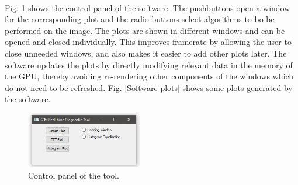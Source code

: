 \documentclass[12pt, twocolumn]{report}
\begin{document}
\paragraph{}
Fig. \ref{Software control panel} shows the control panel of the software. The pushbuttons open a window for the corresponding plot and the radio buttons select algorithms to bo be performed on the image. The plots are shown in different windows and can be opened and closed individually. This improves framerate by allowing the user to close unneeded windows, and also makes it easier to add other plots later. The software updates the plots by directly modifying relevant data in the memory of the GPU, thereby avoiding re-rendering other components of the windows which do not need to be refreshed. Fig. \ref{Software plots} shows some plots generated by the software.

\begin{figure}[htbp]
    \centering
    \includegraphics[width=0.45\textwidth]{Figures/Software screenshot.jpg}
    \caption{Control panel of the tool.}
    \label{Software control panel}
\end{figure}
\end{document}
